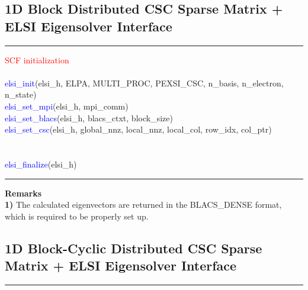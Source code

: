 \documentclass{report}
\begin{document}
\subsection{1D Block Distributed CSC Sparse Matrix + ELSI Eigensolver Interface}
\label{subsec:example_ev_csc}
\noindent\rule{18cm}{0.4pt}
\bigskip

\begin{algorithm}[H]
\textcolor{red}{SCF initialization}\\
\hspace{0.3cm}\\
\textcolor{blue}{elsi\_init}(elsi\_h, ELPA, MULTI\_PROC, PEXSI\_CSC, n\_basis, n\_electron, n\_state)\\
\textcolor{blue}{elsi\_set\_mpi}(elsi\_h, mpi\_comm)\\
\textcolor{blue}{elsi\_set\_blacs}(elsi\_h, blacs\_ctxt, block\_size)\\
\textcolor{blue}{elsi\_set\_csc}(elsi\_h, global\_nnz, local\_nnz, local\_col, row\_idx, col\_ptr)\\
\hspace{0.3cm}\\
\hspace{0.3cm}\\
\textcolor{blue}{elsi\_finalize}(elsi\_h)\\
\end{algorithm}

\bigskip
\noindent\rule{18cm}{0.4pt}

\bigskip
\textbf{Remarks}\\

\textbf{1)} The calculated eigenvectors are returned in the BLACS\_DENSE format, which is required to be properly set up.\\

\subsection{1D Block-Cyclic Distributed CSC Sparse Matrix + ELSI Eigensolver Interface}
\label{subsec:example_ev_csc2}
\noindent\rule{18cm}{0.4pt}
\bigskip
\end{document}

